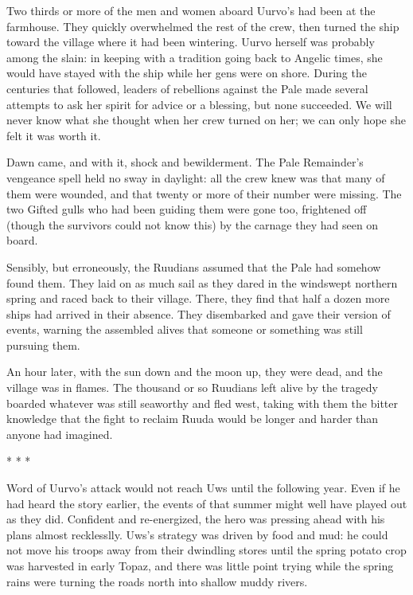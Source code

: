 \documentclass[12pt]{report}
\begin{document}
Two thirds or more of the men and women aboard Uurvo's 
had been at the farmhouse.  They quickly overwhelmed the rest of the
crew, then turned the ship toward the village where it had been
wintering.  Uurvo herself was probably among the slain: in keeping
with a tradition going back to Angelic times, she would have stayed
with the ship while her gens were on shore.  During the centuries that
followed, leaders of rebellions against the Pale made several attempts
to ask her spirit for advice or a blessing, but none succeeded.  We
will never know what she thought when her crew turned on her; we can
only hope she felt it was worth it.

Dawn came, and with it, shock and bewilderment.  The Pale Remainder's
vengeance spell held no sway in daylight: all the crew knew was that
many of them were wounded, and that twenty or more of their number
were missing.  The two Gifted gulls who had been guiding them were
gone too, frightened off (though the survivors could not know this) by
the carnage they had seen on board.

Sensibly, but erroneously, the Ruudians assumed that the Pale had
somehow found them.  They laid on as much sail as they dared in the
windswept northern spring and raced back to their village.  There,
they find that half a dozen more ships had arrived in their absence.
They disembarked and gave their version of events, warning the
assembled alives that someone or something was still pursuing them.

An hour later, with the sun down and the moon up, they were dead, and
the village was in flames.  The thousand or so Ruudians left alive by
the tragedy boarded whatever was still seaworthy and fled west, taking
with them the bitter knowledge that the fight to reclaim Ruuda would
be longer and harder than anyone had imagined.

\begin{center}
* * *
\end{center}

Word of Uurvo's attack would not reach Uws until the following year.
Even if he had heard the story earlier, the events of that summer
might well have played out as they did.  Confident and re-energized,
the hero was pressing ahead with his plans almost recklesslly.  Uws's
strategy was driven by food and mud: he could not move his troops away
from their dwindling stores until the spring potato crop was harvested
in early Topaz, and there was little point trying while the spring
rains were turning the roads north into shallow muddy rivers.
\end{document}
